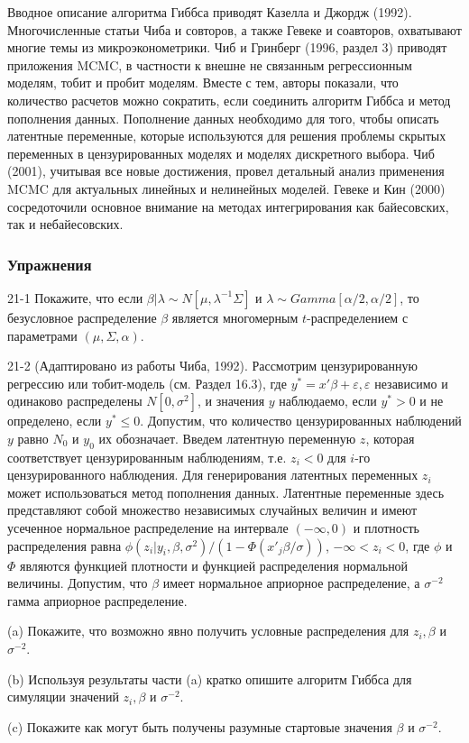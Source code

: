 Вводное описание алгоритма Гиббса приводят Казелла и Джордж (1992). Многочисленные статьи Чиба и совторов, а также Гевеке и соавторов, охватывают многие темы из микроэконометрики. Чиб и Гринберг (1996, раздел 3) приводят приложения MCMC, в частности к внешне не связанным регрессионным моделям, тобит и пробит моделям. Вместе с тем, авторы показали, что количество расчетов можно сократить, если соединить алгоритм Гиббса и метод пополнения данных. 
Пополнение данных необходимо для того, чтобы описать латентные переменные, которые используются для решения проблемы скрытых переменных в цензурированных моделях и моделях дискретного выбора. Чиб (2001), учитывая все новые достижения, провел детальный анализ применения MCMC для актуальных линейных и нелинейных моделей. Гевеке и Кин (2000) сосредоточили основное внимание на методах интегрирования как байесовских, так и небайесовских.


\subsubsection*{Упражнения}

21-1 Покажите, что если $\beta|\lambda{\sim}N[\mu,\lambda^{-1}\Sigma]$ и $\lambda{\sim}Gamma[\alpha/2,\alpha/2]$, то безусловное распределение $\beta$ является многомерным $t$-распределением с параметрами $(\mu,\Sigma,\alpha)$.

21-2 (Адаптировано из работы Чиба, 1992). Рассмотрим цензурированную регрессию или тобит-модель (см. Раздел 16.3), где $y^{*}=x'\beta+\varepsilon, \varepsilon$ независимо и одинаково распределены ${N[0,\sigma^{2}]}$, и значения $y$ наблюдаемо, если $y^{*}>0$ и не определено, если $y^{*}{\leq}0$. Допустим, что количество цензурированных наблюдений $y$ равно $N_0$ и $y_0$ их обозначает. Введем латентную переменную $z$, которая соответствует цензурированным наблюдениям, т.е. $z_{i}<0$ для $i$-го цензурированного наблюдения. Для генерирования латентных переменных $z_i$ может использоваться метод пополнения данных. Латентные переменные здесь представляют собой множество независимых случайных величин и имеют усеченное нормальное распределение на интервале $(-\infty,0)$ и плотность распределения  равна $\phi(z_i|y_i,\beta,\sigma^2)/(1-\Phi(x'_{j}\beta/\sigma))$, $-\infty<z_i<0$, где $\phi$ и $\Phi$ являются функцией плотности и функцией распределения  нормальной величины. Допустим, что $\beta$ имеет нормальное априорное распределение, а $\sigma^{-2}$ гамма априорное распределение.

(a) Покажите, что возможно явно получить условные распределения для $z_i,\beta$ и $\sigma^{-2}$.

(b) Используя результаты части (a) кратко опишите алгоритм Гиббса для симуляции значений $z_i, \beta$ и $\sigma^{-2}$.

(c) Покажите как могут быть получены разумные стартовые значения $\beta$ и $\sigma^{-2}$. 



